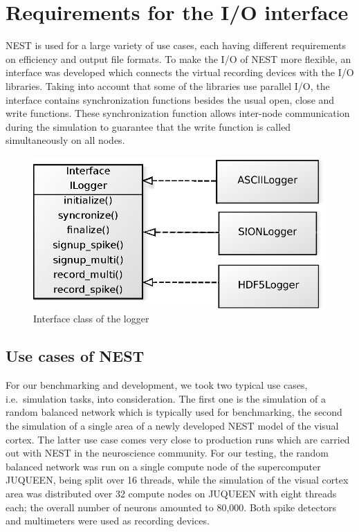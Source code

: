 \documentclass[]{YIC2015}
\begin{document}
\section{Requirements for the I/O interface}

NEST is used for a large variety of use cases, each having different
requirements on efficiency and output file formats. To make the I/O of
NEST more flexible, an interface was developed which connects the
virtual recording devices with the I/O libraries. Taking into account that some
of the libraries use parallel I/O, the interface contains
synchronization functions besides the usual open, close and write
functions. These synchronization function allows inter-node
communication during the simulation to guarantee that the write
function is called simultaneously on all nodes.

\begin{figure}[htbp]
\centering %
\includegraphics[scale=0.5]{loggerinterface.eps}
\caption{Interface class of the logger}
\label{fig:loggerinterface}
\end{figure}

\subsection{Use cases of NEST}

For our benchmarking and development, we took two typical use cases,
i.e.~simulation tasks, into consideration. The first one is the simulation of a
random balanced network \cite{morrison07} which is typically used for
benchmarking, the second the simulation of a single area of a newly developed
NEST model of the visual cortex. The latter use case comes very close to
production runs which are carried out with NEST in the neuroscience community.
For our testing, the random balanced network was run on a single compute node of
the supercomputer JUQUEEN, being split over 16 threads, while the simulation of
the visual cortex area was distributed over 32 compute nodes on JUQUEEN with
eight threads each; the overall number of neurons amounted to 80,000. Both spike
detectors and multimeters were used as recording devices.
\end{document}
